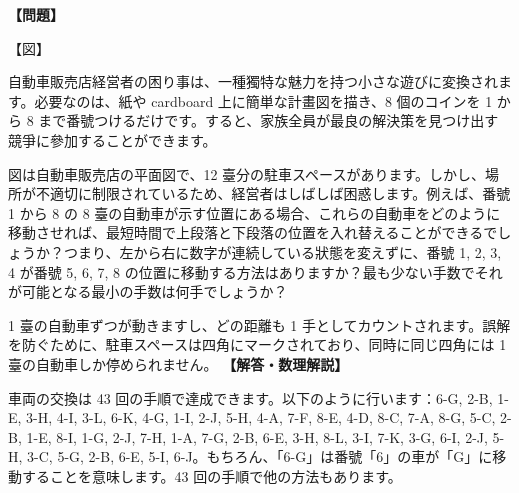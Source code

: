 \documentclass[10pt,a4paper,oneside,openany]{ltjsbook}
\begin{document}
\begin{tcolorbox}[colback=softblue,colframe=primaryblue,title=\textbf{第 224 問：モーターゲージのパズル （原題: THE MOTOR-GARAGE PUZZLE.）},arc=2mm,boxrule=1pt,breakable]
\textbf{【問題】}\par\vspace{0.3em}
【図】

自動車販売店経営者の困り事は、一種獨特な魅力を持つ小さな遊びに変換されます。必要なのは、紙や cardboard 上に簡単な計畫図を描き、8 個のコインを 1 から 8 まで番號つけるだけです。すると、家族全員が最良の解決策を見つけ出す競爭に參加することができます。

図は自動車販売店の平面図で、12 臺分の駐車スペースがあります。しかし、場所が不適切に制限されているため、経営者はしばしば困惑します。例えば、番號 1 から 8 の 8 臺の自動車が示す位置にある場合、これらの自動車をどのように移動させれば、最短時間で上段落と下段落の位置を入れ替えることができるでしょうか？つまり、左から右に数字が連続している狀態を変えずに、番號 1, 2, 3, 4 が番號 5, 6, 7, 8 の位置に移動する方法はありますか？最も少ない手数でそれが可能となる最小の手数は何手でしょうか？

1 臺の自動車ずつが動きますし、どの距離も 1 手としてカウントされます。誤解を防ぐために、駐車スペースは四角にマークされており、同時に同じ四角には 1 臺の自動車しか停められません。
\tcblower
\textbf{【解答・数理解説】}\par\vspace{0.3em}
車両の交換は 43 回の手順で達成できます。以下のように行います：6-G, 2-B, 1-E, 3-H, 4-I, 3-L, 6-K, 4-G, 1-I, 2-J, 5-H, 4-A, 7-F, 8-E, 4-D, 8-C, 7-A, 8-G, 5-C, 2-B, 1-E, 8-I, 1-G, 2-J, 7-H, 1-A, 7-G, 2-B, 6-E, 3-H, 8-L, 3-I, 7-K, 3-G, 6-I, 2-J, 5-H, 3-C, 5-G, 2-B, 6-E, 5-I, 6-J。もちろん、「6-G」は番號「6」の車が「G」に移動することを意味します。43 回の手順で他の方法もあります。
\end{tcolorbox}
\end{document}
